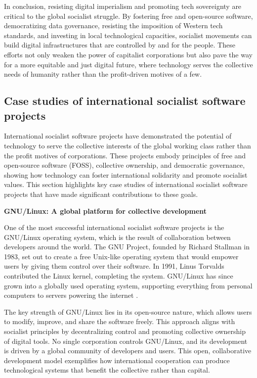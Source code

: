 \begin{refsection}
In conclusion, resisting digital imperialism and promoting tech sovereignty are critical to the global socialist struggle. By fostering free and open-source software, democratizing data governance, resisting the imposition of Western tech standards, and investing in local technological capacities, socialist movements can build digital infrastructures that are controlled by and for the people. These efforts not only weaken the power of capitalist corporations but also pave the way for a more equitable and just digital future, where technology serves the collective needs of humanity rather than the profit-driven motives of a few.

\subsection{Case studies of international socialist software projects}

International socialist software projects have demonstrated the potential of technology to serve the collective interests of the global working class rather than the profit motives of corporations. These projects embody principles of free and open-source software (FOSS), collective ownership, and democratic governance, showing how technology can foster international solidarity and promote socialist values. This section highlights key case studies of international socialist software projects that have made significant contributions to these goals.

\textbf{GNU/Linux: A global platform for collective development}

One of the most successful international socialist software projects is the GNU/Linux operating system, which is the result of collaboration between developers around the world. The GNU Project, founded by Richard Stallman in 1983, set out to create a free Unix-like operating system that would empower users by giving them control over their software. In 1991, Linus Torvalds contributed the Linux kernel, completing the system. GNU/Linux has since grown into a globally used operating system, supporting everything from personal computers to servers powering the internet \cite[pp.~45-53]{stallman_free_software}.

The key strength of GNU/Linux lies in its open-source nature, which allows users to modify, improve, and share the software freely. This approach aligns with socialist principles by decentralizing control and promoting collective ownership of digital tools. No single corporation controls GNU/Linux, and its development is driven by a global community of developers and users. This open, collaborative development model exemplifies how international cooperation can produce technological systems that benefit the collective rather than capital.


\end{refsection}
